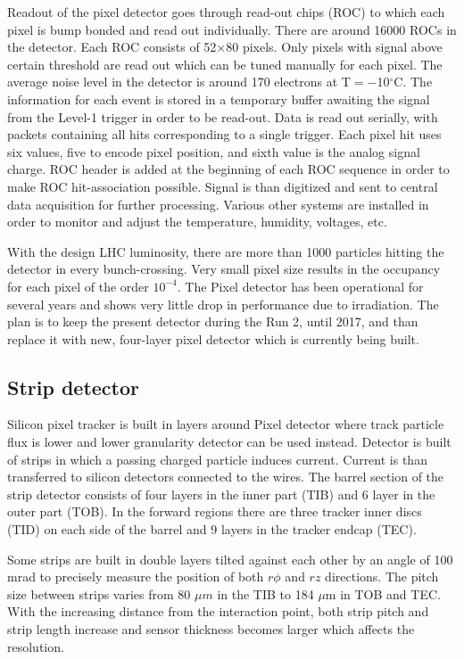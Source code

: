 \par Readout of the pixel detector goes through read-out chips (ROC) to which each pixel is bump bonded and read out individually. There are around 16000 ROCs in the detector. Each ROC consists of 52$\times$80 pixels. Only pixels with signal above certain threshold are read out which can be tuned manually for each pixel. The average noise level in the detector is around 170 electrons at T$=-$10$^\circ$C. The information for each event is stored in a temporary buffer awaiting the signal from the Level-1 trigger in order to be read-out. Data is read out serially, with packets containing all hits corresponding to a single trigger. Each pixel hit uses six values, five to encode pixel position, and sixth value is the analog signal charge. ROC header is added at the beginning of each ROC sequence in order to make ROC hit-association possible. Signal is than digitized and sent to central data acquisition for further processing. Various other systems are installed in order to monitor and adjust the temperature, humidity, voltages, etc. 
\par With the design LHC luminosity, there are more than 1000 particles hitting the detector in every bunch-crossing. Very small pixel size results in the occupancy for each pixel of the order $10^{-4}$. The Pixel detector has been operational for several years and shows very little drop in performance due to irradiation. The plan is to keep the present detector during the Run 2, until 2017, and than replace it with new, four-layer pixel detector which is currently being built.


\subsection{Strip detector}

Silicon pixel tracker is built in layers around Pixel detector where track particle flux is lower and lower granularity detector can be used instead. Detector is built of strips in which a passing charged particle induces current. Current is than transferred to silicon detectors connected to the wires. The barrel section of the strip detector consists of four layers in the inner part (TIB) and 6 layer in the outer part (TOB). In the forward regions there are three tracker inner discs (TID) on each side of the barrel and 9 layers in the tracker endcap (TEC). 
\par Some strips are built in double layers tilted against each other by an angle of 100 mrad to precisely measure the position of both $r\phi$ and $rz$ directions. The pitch size between strips varies from 80 $\mu m$ in the TIB to 184 $\mu$m in TOB and TEC. With the increasing distance from the interaction point, both strip pitch and strip length increase and sensor thickness becomes larger which affects the resolution.    

